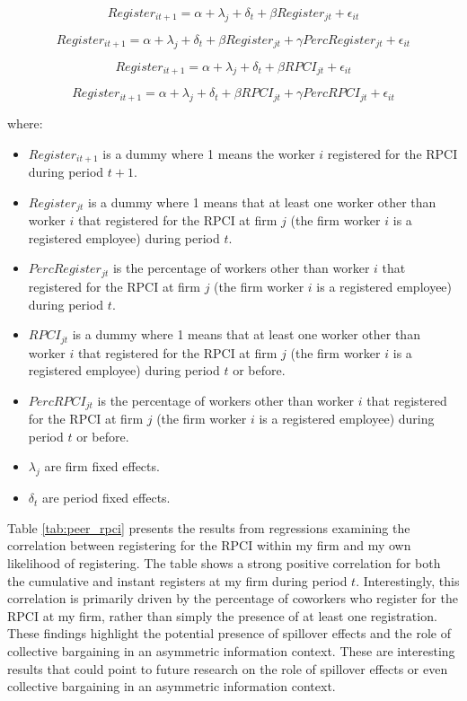 \documentclass[10pt, oneside]{book}
\begin{document}
\begin{equation}
Register_{it+1} = \alpha + \lambda_j + \delta_t + \beta Register_{jt} + \epsilon_{it}
\end{equation}

\begin{equation}
Register_{it+1} = \alpha + \lambda_j + \delta_t + \beta Register_{jt} + \gamma Perc Register_{jt} + \epsilon_{it}
\end{equation}

\begin{equation}
Register_{it+1} = \alpha + \lambda_j + \delta_t + \beta RPCI_{jt} + \epsilon_{it}
\end{equation}

\begin{equation}
Register_{it+1} = \alpha + \lambda_j + \delta_t + \beta RPCI_{jt} + \gamma Perc RPCI_{jt} + \epsilon_{it}
\end{equation}

where:

\begin{itemize}
    \item $Register_{it+1}$ is a dummy where 1 means the worker $i$ registered for the RPCI during period $t+1$.
    \item $Register_{jt}$ is a dummy where 1 means that at least one worker other than worker $i$ that registered for the RPCI at firm $j$ (the firm worker $i$ is a registered employee) during period $t$.
    \item $PercRegister_{jt}$ is the percentage of workers other than worker $i$ that registered for the RPCI at firm $j$ (the firm worker $i$ is a registered employee) during period $t$.
    \item $RPCI_{jt}$ is a dummy where 1 means that at least one worker other than worker $i$ that registered for the RPCI at firm $j$ (the firm worker $i$ is a registered employee) during period $t$ or before.
    \item $PercRPCI_{jt}$ is the percentage of workers other than worker $i$ that registered for the RPCI at firm $j$ (the firm worker $i$ is a registered employee) during period $t$ or before.
    \item $\lambda_j$ are firm fixed effects.
    \item $\delta_t$ are period fixed effects.
\end{itemize}

Table \ref{tab:peer_rpci} presents the results from regressions examining the correlation between registering for the RPCI within my firm and my own likelihood of registering. The table shows a strong positive correlation for both the cumulative and instant registers at my firm during period $t$. Interestingly, this correlation is primarily driven by the percentage of coworkers who register for the RPCI at my firm, rather than simply the presence of at least one registration. These findings highlight the potential presence of spillover effects and the role of collective bargaining in an asymmetric information context. These are interesting results that could point to future research on the role of spillover effects or even collective bargaining in an asymmetric information context. \\
\end{document}
